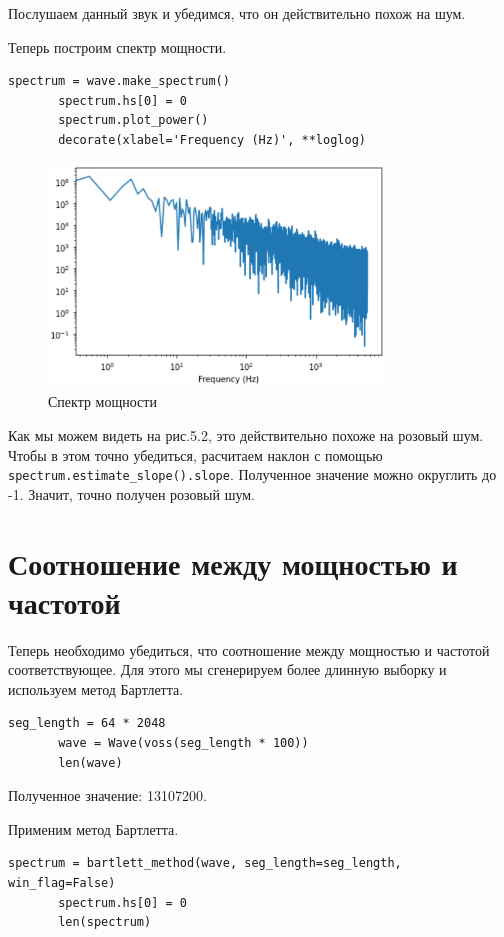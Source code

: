 \documentclass[a4paper,12pt]{report}
\begin{document}
    Послушаем данный звук и убедимся, что он действительно похож на шум.
    
    Теперь построим спектр мощности.
\begin{lstlisting}[caption=Получение спектра мощности]
       spectrum = wave.make_spectrum()
       spectrum.hs[0] = 0
       spectrum.plot_power()
       decorate(xlabel='Frequency (Hz)', **loglog)
\end{lstlisting}
\begin{figure}[H]
        \centering
        \includegraphics[width=0.8\textwidth]{fig5-2.PNG}
        \caption{Спектр мощности}
        \label{fig:fig5-2}
\end{figure} 

    Как мы можем видеть на рис.5.2, это действительно похоже на розовый шум. Чтобы в этом точно убедиться, расчитаем наклон с помощью \texttt{spectrum.estimate\_slope().slope}. Полученное значение можно округлить до -1. Значит, точно получен розовый шум.
\section{Соотношение между мощностью и частотой}
    Теперь необходимо убедиться, что соотношение между мощностью и частотой соответствующее. Для этого мы сгенерируем более длинную выборку и используем метод Бартлетта.
\begin{lstlisting}[caption=Создание выборки]
       seg_length = 64 * 2048
       wave = Wave(voss(seg_length * 100))
       len(wave)
\end{lstlisting}

    Полученное значение: 13107200.
    
    Применим метод Бартлетта.
\begin{lstlisting}[caption=Использование метода Бартлетта]
       spectrum = bartlett_method(wave, seg_length=seg_length, win_flag=False)
       spectrum.hs[0] = 0
       len(spectrum)
\end{lstlisting}  
\end{document}
